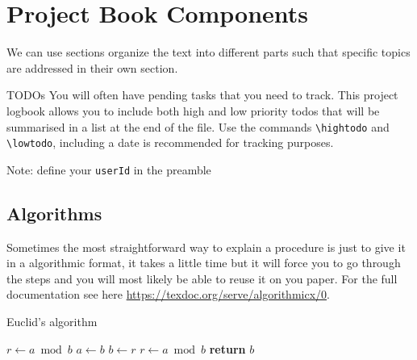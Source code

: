 \documentclass{project-logbook}
\begin{document}
\section{Project Book Components} \label{sec:topic_B}

	We can use sections organize the text into different parts  such that specific topics are addressed in their own section.

		\begin{HighlightedNote}{TODOs}
			You will often have pending tasks that you need to track. This project logbook allows you to include both high and low priority todos that will be summarised in a list at the end of the file. Use the commands \texttt{\textbackslash hightodo} and \texttt{\textbackslash lowtodo}, including a date is recommended for tracking purposes.

			Note: define your \texttt{userId} in the preamble
		\end{HighlightedNote}





		\subsection{Algorithms} \label{sub:algorithms}

		\begin{HighlightedNote}{}
			Sometimes the most straightforward way to explain a procedure is just to give it in a algorithmic format, it takes a little time but it will force you to go through the steps and you will most likely be able to reuse it on you paper. For the full documentation see here \url{https://texdoc.org/serve/algorithmicx/0}.
		\end{HighlightedNote}

		\begin{algorithm}
			\caption{Euclid’s algorithm}\label{alg:euclid}
			\begin{algorithmic}[1]
					\State $r\gets a\bmod b$
						\State $a\gets b$
						\State $b\gets r$
						\State $r\gets a\bmod b$
					\EndWhile\label{euclidendwhile}
					\State \textbf{return} $b$
				\EndProcedure
			\end{algorithmic}
		\end{algorithm}
\end{document}
